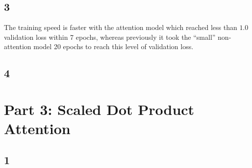 \documentclass{article}
\begin{document}
\subsection*{3}
The training speed is faster with the attention model which reached less than $1.0$ validation loss within 7 epochs, whereas previously it took the ``small'' non-attention model 20 epochs to reach this level of validation loss.

\subsection*{4}




\section*{Part 3: Scaled Dot Product Attention}

\subsection*{1}
\end{document}
